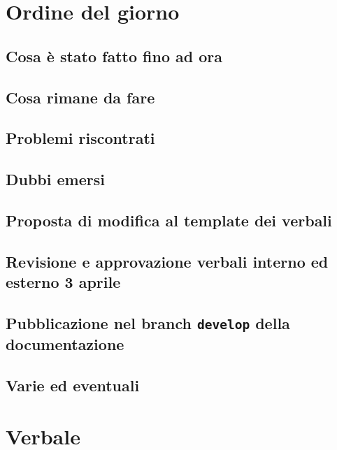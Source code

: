 \documentclass[italian,12pt]{article}
\begin{document}
\section{Ordine del giorno}
\subsection{Cosa è stato fatto fino ad ora}
\subsection{Cosa rimane da fare}
\subsection{Problemi riscontrati}
\subsection{Dubbi emersi}
\subsection{Proposta di modifica al template dei verbali}
\subsection{Revisione e approvazione verbali interno ed esterno 3 aprile}
\subsection{Pubblicazione nel branch \texttt{develop} della documentazione}
\subsection{Varie ed eventuali}

\newpage

\section{Verbale}
\end{document}
